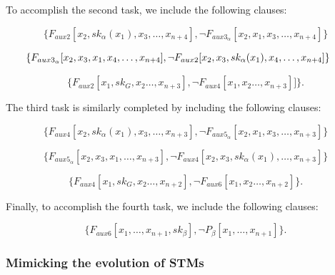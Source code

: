 \documentclass[%
  manuscript=article,   %
  year=2024,
  volume=77,
  doi=00000.000,
]{zfn}
\begin{document}
To accomplish the second task, we include the following clauses:

\begin{equation}
\{F_{aux2}[x_2, sk_{\alpha}(x_1), x_3, \ldots, x_{n+4}], 
\neg F_{aux3_{\alpha}}[x_2, x_1, x_3, \ldots, x_{n+4}]\}
\end{equation}

\begin{equation}
\hspace{-0.5cm} \{F_{aux3_{\alpha}}[x_2, x_3, x_1, x_4, \ldots, x_{n+4}],
\neg F_{aux2}[x_2, x_3, sk_{\alpha}(x_1), x_4, \ldots , x_{n+4}]\}
\end{equation}

\begin{equation}
\{F_{aux2}[x_1, sk_G, x_2\ldots, x_{n+3}],
\neg F_{aux4}[x_1, x_2 \ldots, x_{n+3}]]\}.
\end{equation}

The third task is similarly completed by including the following clauses:

\begin{equation}\{F_{aux4}[x_2, sk_{\alpha}(x_1), x_3, \ldots, x_{n+3}], 
\neg F_{aux5_{\alpha}}[x_2, x_1, x_3, \ldots, x_{n+3}]\}
\end{equation}

\begin{equation}
\{F_{aux5_{\alpha}}[x_2, x_3, x_1, \ldots, x_{n+3}],
\neg F_{aux4}[x_2, x_3, sk_{\alpha}(x_1), \ldots, x_{n+3}]\}
\end{equation}

\begin{equation}
\{F_{aux4}[x_1, sk_G, x_2 \ldots, x_{n+2}],
\neg F_{aux6}[x_1, x_2 \ldots, x_{n+2}]\}.
\end{equation}

Finally, to accomplish the fourth task, we include the following clauses:

\begin{equation}
\{F_{aux6}[x_1, \ldots, x_{n+1}, sk_\beta],
\neg P_\beta[x_1, \ldots, x_{n+1}]\}. \label{Pbeta}
\end{equation}

\subsubsection{Mimicking the evolution of STMs}
\end{document}
